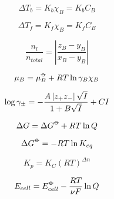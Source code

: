 \documentclass[12pt, letterpaper]{memoir}
\begin{document}
\noindent
\begin{minipage}[t]{0.5\linewidth}
	\begin{equation*}
		\Delta T_b=K_b\chi_B = K_bC_B
	\end{equation*}

	\begin{equation*}
		\Delta T_f=K_f\chi_B=K_fC_B
	\end{equation*}

	\begin{equation*}
		\frac{n_l}{n_{total}}=\left|\frac{z_B-y_B}{x_B-y_B}\right|
	\end{equation*}

	\begin{equation*}
		\mu_B=\mu^{\std}_B+RT\ln\gamma_B\chi_B
	\end{equation*}

	\begin{equation*}
		\log\gamma_\pm = -\frac{A\left| z_+z_- \right|\sqrt{I}}{1+B\sqrt{I}} + CI
	\end{equation*}

	\begin{equation*}
		\Delta G = \Delta G^{\std} +RT\ln Q
	\end{equation*}

	\begin{equation*}
		\Delta G^{\std}=-RT\ln K_{eq}
	\end{equation*}

	\begin{equation*}
		K_p=K_C\left(RT\right)^{\Delta n}
	\end{equation*}

	\begin{equation*}
		E_{cell}=E^{\std}_{cell}-\frac{RT}{\nu F}\ln Q
	\end{equation*}
\end{minipage}
\end{document}
